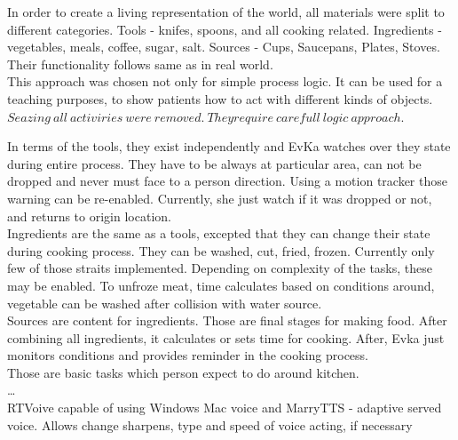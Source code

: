 \documentclass[18pt]{article}
\numberwithin{equation}{section} %
\numberwithin{figure}{section} %
\numberwithin{table}{section} %
\begin{document}
	In order to create a living representation of the world, all materials were split to different categories. Tools - knifes, spoons, and all cooking related. Ingredients - vegetables, meals, coffee, sugar, salt. Sources - Cups, Saucepans, Plates, Stoves. Their functionality follows same as in real world. \\
	This approach was chosen not only for simple process logic. It can be used for a teaching purposes, to show patients how to act with different kinds of objects. \\
	
	$ Seazing\ all\ activiries\ were\ removed.\ They require\ carefull\ logic\ approach. $
	
	In terms of the tools, they exist independently and EvKa watches over they state during entire process. They have to be always at particular area, can not be dropped and never must face to a person direction. Using a motion tracker those warning can be re-enabled. Currently, she just watch if it was dropped or not, and returns to origin location. \\
	
	Ingredients are the same as a tools, excepted that they can change their state during cooking process. They can be washed, cut, fried, frozen. Currently only few of those straits implemented. Depending on complexity of the tasks, these may be enabled. To unfroze meat, time calculates based on conditions around, vegetable can be washed after collision with water source. \\
	
	Sources are content for ingredients. Those are final stages for making food. After combining all ingredients, it calculates or sets time for cooking. After, Evka just monitors conditions and provides reminder in the cooking process. \\
	
	Those are basic tasks which person expect to do around kitchen. \\
	
	\ldots \\
	
	RTVoive capable of using Windows Mac voice and MarryTTS - adaptive served voice. Allows change sharpens, type and speed of voice acting, if necessary
	
\end{document}
